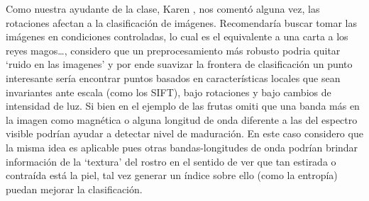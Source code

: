 \documentclass[paper=letter, fontsize=11pt]{scrartcl}
\numberwithin{equation}{section} %
\numberwithin{figure}{section} %
\numberwithin{table}{section} %
\begin{document}
Como nuestra ayudante de la clase, Karen , nos comentó alguna vez, las rotaciones afectan a la clasificación de imágenes. Recomendaría buscar tomar las imágenes en condiciones controladas, lo cual es el equivalente a una carta a los reyes magos…, considero que un preprocesamiento más robusto podria quitar ‘ruido en las imagenes’ y por ende suavizar la frontera de clasificación un punto interesante sería encontrar puntos basados en características locales que sean invariantes ante escala (como los SIFT), bajo rotaciones y bajo cambios de intensidad de luz. Si bien en el ejemplo de las frutas omiti que una banda más en la imagen como magnética o alguna longitud de onda diferente a las del espectro visible podrían ayudar a detectar nivel de maduración. En este caso considero que la misma idea es aplicable pues otras bandas-longitudes de onda podrían brindar información de la ‘textura’ del rostro en el sentido de ver que tan estirada o contraída está la piel, tal vez generar un índice sobre ello (como la entropía) puedan mejorar la clasificación.
\end{document}
